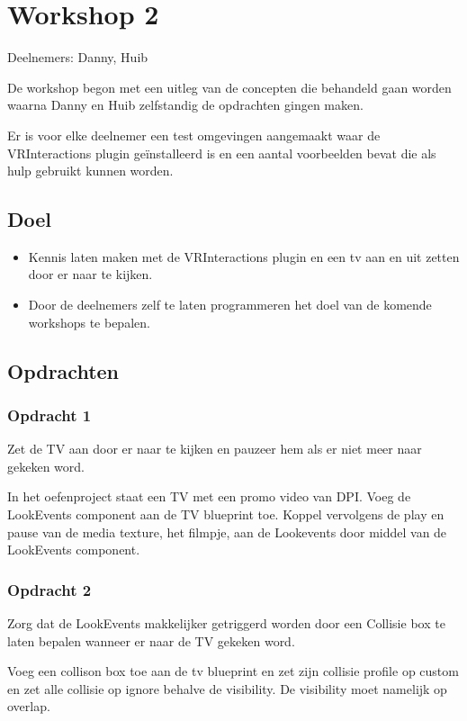 
\chapter{Workshop 2}
\label{appendix:workshop2}
\lhead{}
Deelnemers: Danny, Huib

De workshop begon met een uitleg van de concepten die behandeld gaan worden waarna Danny en Huib zelfstandig de opdrachten gingen maken.

Er is voor elke deelnemer een test omgevingen aangemaakt waar de VRInteractions plugin geïnstalleerd is en een aantal voorbeelden bevat die als hulp gebruikt kunnen worden.

\section{Doel}
\begin{itemize}
	\item Kennis laten maken met de VRInteractions plugin en een tv aan en uit zetten door er naar te kijken.
	\item Door de deelnemers zelf te laten programmeren het doel van de komende workshops te bepalen. 
\end{itemize}

\section{Opdrachten}

\subsection{Opdracht 1}
Zet de TV aan door er naar te kijken en pauzeer hem als er niet meer naar gekeken word.

In het oefenproject staat een TV met een promo video van DPI. 
Voeg de LookEvents component aan de TV blueprint toe.
Koppel vervolgens de play en pause van de media texture, het filmpje, aan de Lookevents door middel van de LookEvents component.

\subsection{Opdracht 2}
Zorg dat de LookEvents makkelijker getriggerd worden door een Collisie box te laten bepalen wanneer er naar de TV gekeken word.

Voeg een collison box toe aan de tv blueprint en zet zijn collisie profile op custom en zet alle collisie op ignore behalve de visibility. De visibility moet namelijk op overlap.

